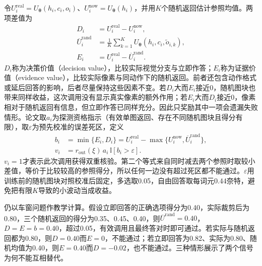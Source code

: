 令$U_i^{\mathrm{real}}=U_{\bm\theta}(h_i,c_i,o_i)$、$U_i^{\mathrm{now}}=U_{\bm\theta}(h_i)$，并用$K$个随机返回估计参照均值。两项差值为
\begin{equation}
  \begin{aligned}
    D_i&=U_i^{\mathrm{real}}-U_i^{\mathrm{now}},\\
    \overline U_i^{\mathrm{rand}}
      &=\frac1K\sum_{k=1}^{K}
          U_{\bm\theta}(h_i,c_i,\widetilde o_{i,k}),\\
    E_i&=U_i^{\mathrm{real}}-\overline U_i^{\mathrm{rand}}.
  \end{aligned}
  \label{eq:vision-countercredit-values}
\end{equation}
$D_i$称为决策价值（decision value），比较实际视觉分支与立即作答；$E_i$称为证据价值（evidence value），比较实际像素与同动作下的随机返回。前者还包含动作格式或延后回答的影响，后者尽量保持这些因素不变。若$D_i$大而$E_i$接近0，随机图块也带来同样收益，这次调用没有显示真实像素的额外作用；若$E_i$大而$D_i$接近0，像素相对于随机返回有信息，但立即作答已同样充分。因此只奖励其中一项会遗漏失败情形。论文取$a_i$为探测资格指示（有效单图返回、存在不同随机图块且得分有限），取$\varepsilon$为预先校准的误差死区，定义
\begin{equation}
  \begin{aligned}
    b_i&=\min\{E_i,D_i\}
        =U_i^{\mathrm{real}}
          -\max\{U_i^{\mathrm{now}},\overline U_i^{\mathrm{rand}}\},\\
    v_i&=r_{\mathrm{out}}(\xi)\,a_i\,\mathbb I[b_i>\varepsilon].
  \end{aligned}
  \label{eq:vision-countercredit-verification}
\end{equation}
$v_i=1$才表示此次调用获得双重核验。第二个等式来自同时减去两个参照时取较小差值，等价于比较较高的参照得分，所以任何一边没有超过死区都不能通过。$\varepsilon$用训练前的随机图块对照校准后固定，多选取0.05，自由回答取每词元0.44奈特，避免把有限$K$导致的小波动当成收益。

仍以车窗问题作教学计算。假设立即回答的正确选项得分为0.40，实际裁剪后为0.80，三个随机返回的得分为0.35、0.45、0.40，则$\overline U^{\mathrm{rand}}=0.40$，$D=E=b=0.40$，超过0.05，有效调用且最终答对时即可通过。若实际与随机返回都为0.80，则$D=0.40$而$E=0$，不能通过；若立即回答为0.82、实际为0.80、随机均值为0.40，则$E=0.40$而$D=-0.02$，也不能通过。三种情形展示了两个信号为何不能互相替代。

